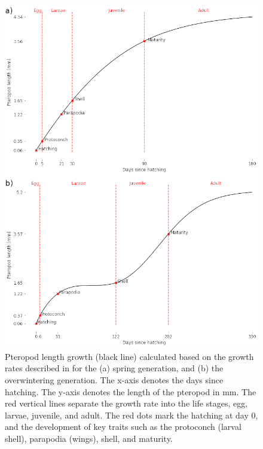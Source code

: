 \begin{figure}[tbh!]
    \centering
    
        \includegraphics[scale=0.5]{images/Growth_both.png}
       
    
    \caption{Pteropod length growth (black line) calculated based on the growth rates described in \cite{Wang2017Lifecycle} for the (a) spring generation, and (b) the overwintering generation. The x-axis denotes the days since hatching. The y-axis denotes the length of the pteropod in mm. The red vertical lines separate the growth rate into the life stages, egg, larvae, juvenile, and adult. The red dots mark the hatching at day 0, and the development of key traits such as the protoconch (larval shell), parapodia (wings), shell, and maturity.}
    \label{fig:optimal_growth}
\end{figure}


